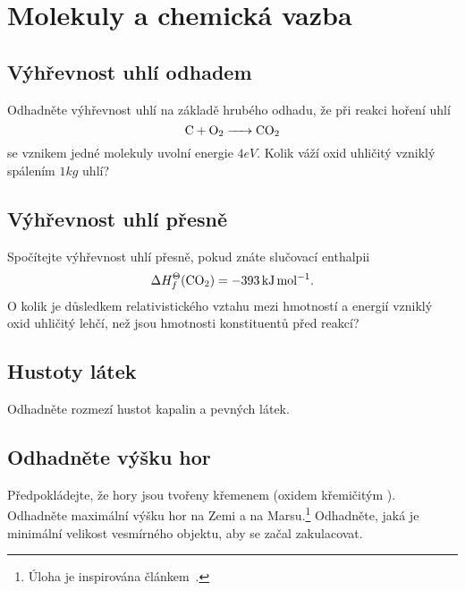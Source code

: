 \section{Molekuly a chemická vazba}
    \subsection{Výhřevnost uhlí odhadem}
        Odhadněte výhřevnost uhlí na základě hrubého odhadu, že při reakci hoření uhlí
        \begin{equation}
            \ce{C + O2 -> CO2}
        \end{equation}
        se vznikem jedné molekuly uvolní energie $4\unit{eV}$.
        Kolik váží oxid uhličitý vzniklý spálením $1\unit{kg}$ uhlí?

    \subsection{Výhřevnost uhlí přesně}
        Spočítejte výhřevnost uhlí přesně, pokud znáte slučovací enthalpii
        \begin{equation}
            \Delta H_{f}^{\Theta}(\ce{CO2})=-393\unit{kJ}\unit{mol^{-1}}.
        \end{equation}
        O kolik je důsledkem relativistického vztahu mezi hmotností a energií vzniklý oxid uhličitý lehčí, než jsou hmotnosti konstituentů před reakcí?

    \subsection{Hustoty látek}
        Odhadněte rozmezí hustot kapalin a pevných látek.

    \subsection{Odhadněte výšku hor}
        Předpokládejte, že hory jsou tvořeny křemenem (oxidem křemičitým ).
        Odhadněte maximální výšku hor na Zemi a na Marsu.\footnote{Úloha je inspirována článkem~\cite{Weisskopf1975}.}
        Odhadněte, jaká je minimální velikost vesmírného objektu, aby se začal zakulacovat.